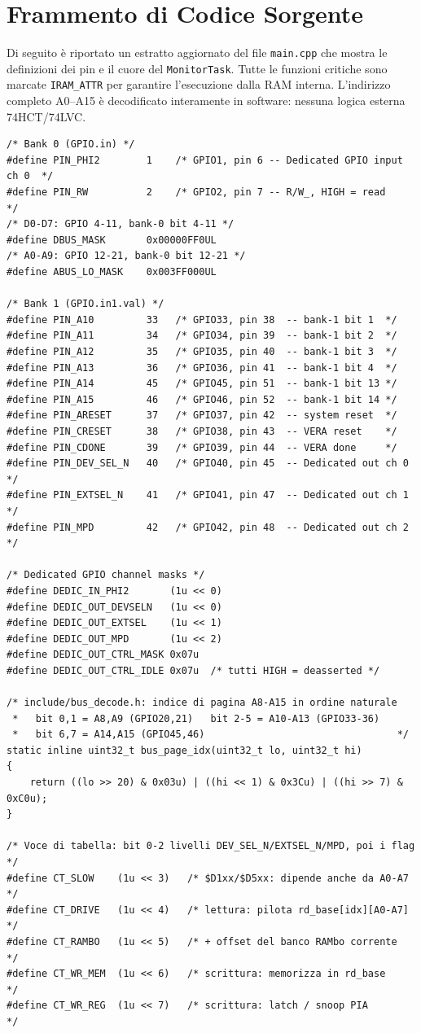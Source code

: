 \documentclass[12pt, a4paper]{article}
\begin{document}
\section{Frammento di Codice Sorgente}
Di seguito è riportato un estratto aggiornato del file \texttt{main.cpp} che mostra le definizioni dei pin e il cuore del \texttt{MonitorTask}. Tutte le funzioni critiche sono marcate \texttt{IRAM\_ATTR} per garantire l'esecuzione dalla RAM interna. L'indirizzo completo A0--A15 è decodificato interamente in software: nessuna logica esterna 74HCT/74LVC.

\begin{lstlisting}[style=cppstyle, caption={Definizioni pin ESP32-S3FN8 (QFN56) -- firmware corrente}, label=code:mcu_select]
/* Bank 0 (GPIO.in) */
#define PIN_PHI2        1    /* GPIO1, pin 6 -- Dedicated GPIO input ch 0  */
#define PIN_RW          2    /* GPIO2, pin 7 -- R/W_, HIGH = read           */
/* D0-D7: GPIO 4-11, bank-0 bit 4-11 */
#define DBUS_MASK       0x00000FF0UL
/* A0-A9: GPIO 12-21, bank-0 bit 12-21 */
#define ABUS_LO_MASK    0x003FF000UL

/* Bank 1 (GPIO.in1.val) */
#define PIN_A10         33   /* GPIO33, pin 38  -- bank-1 bit 1  */
#define PIN_A11         34   /* GPIO34, pin 39  -- bank-1 bit 2  */
#define PIN_A12         35   /* GPIO35, pin 40  -- bank-1 bit 3  */
#define PIN_A13         36   /* GPIO36, pin 41  -- bank-1 bit 4  */
#define PIN_A14         45   /* GPIO45, pin 51  -- bank-1 bit 13 */
#define PIN_A15         46   /* GPIO46, pin 52  -- bank-1 bit 14 */
#define PIN_ARESET      37   /* GPIO37, pin 42  -- system reset  */
#define PIN_CRESET      38   /* GPIO38, pin 43  -- VERA reset    */
#define PIN_CDONE       39   /* GPIO39, pin 44  -- VERA done     */
#define PIN_DEV_SEL_N   40   /* GPIO40, pin 45  -- Dedicated out ch 0 */
#define PIN_EXTSEL_N    41   /* GPIO41, pin 47  -- Dedicated out ch 1 */
#define PIN_MPD         42   /* GPIO42, pin 48  -- Dedicated out ch 2 */

/* Dedicated GPIO channel masks */
#define DEDIC_IN_PHI2       (1u << 0)
#define DEDIC_OUT_DEVSELN   (1u << 0)
#define DEDIC_OUT_EXTSEL    (1u << 1)
#define DEDIC_OUT_MPD       (1u << 2)
#define DEDIC_OUT_CTRL_MASK 0x07u
#define DEDIC_OUT_CTRL_IDLE 0x07u  /* tutti HIGH = deasserted */

/* include/bus_decode.h: indice di pagina A8-A15 in ordine naturale
 *   bit 0,1 = A8,A9 (GPIO20,21)   bit 2-5 = A10-A13 (GPIO33-36)
 *   bit 6,7 = A14,A15 (GPIO45,46)                                 */
static inline uint32_t bus_page_idx(uint32_t lo, uint32_t hi)
{
    return ((lo >> 20) & 0x03u) | ((hi << 1) & 0x3Cu) | ((hi >> 7) & 0xC0u);
}

/* Voce di tabella: bit 0-2 livelli DEV_SEL_N/EXTSEL_N/MPD, poi i flag */
#define CT_SLOW    (1u << 3)   /* $D1xx/$D5xx: dipende anche da A0-A7 */
#define CT_DRIVE   (1u << 4)   /* lettura: pilota rd_base[idx][A0-A7] */
#define CT_RAMBO   (1u << 5)   /* + offset del banco RAMbo corrente   */
#define CT_WR_MEM  (1u << 6)   /* scrittura: memorizza in rd_base     */
#define CT_WR_REG  (1u << 7)   /* scrittura: latch / snoop PIA        */
\end{lstlisting}
\end{document}
